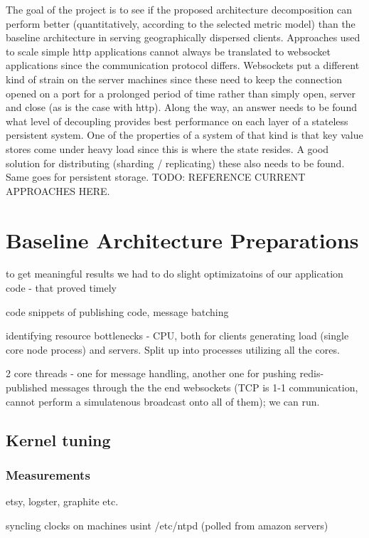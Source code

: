 \documentclass{uvamscse}
\begin{document}
The goal of the project is to see if the proposed architecture decomposition can perform better (quantitatively, according to the selected metric model) than the baseline architecture in serving geographically dispersed clients. Approaches used to scale simple http applications cannot always be translated to websocket applications since the communication protocol differs. Websockets put a different kind of strain on the server machines since these need to keep the connection opened on a port for a prolonged period of time rather than simply open, server and close (as is the case with http). Along the way, an answer needs to be found what level of decoupling provides best performance on each layer of a stateless persistent system. One of the properties of a system of that kind is that key value stores come under heavy load since this is where the state resides. A good solution for distributing (sharding / replicating) these also needs to be found. Same goes for persistent storage.
TODO: REFERENCE CURRENT APPROACHES HERE.

\section{Baseline Architecture Preparations}\label{Baseline Architecture}
to get meaningful results we had to do slight optimizatoins of our application code - that proved timely

code snippets of publishing code, message batching

identifying resource bottlenecks - CPU, both for clients generating load (single core node process) and servers. Split up into processes utilizing all the cores.

2 core threads - one for message handling, another one for pushing redis-published messages through the the end websockets (TCP is 1-1 communication, cannot perform a simulatenous broadcast onto all of them); we can run.

\subsection{Kernel tuning}\label{Kernel tuning}

\subsubsection{Measurements}
etsy, logster, graphite etc.

syncling clocks on machines usint /etc/ntpd (polled from amazon servers)
\end{document}

